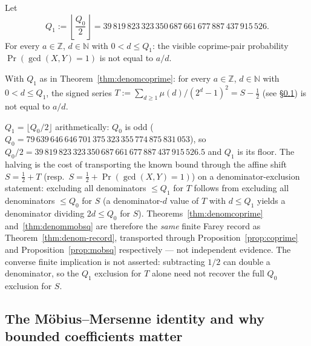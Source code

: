 \begin{thm}
\label{thm:denomcoprime}
Let
\[
Q_1 := \left\lfloor \frac{Q_0}{2} \right\rfloor = 39\,819\,823\,323\,350\,687\,661\,677\,887\,437\,915\,526.
\]
For every $a\in\mathbb{Z}$, $d\in\mathbb{N}$ with $0<d\le Q_1$: the visible
coprime-pair probability $\Pr(\gcd(X,Y)=1)$ is not equal to $a/d$.
  
\end{thm}

\begin{thm}
\label{thm:denommobsq}
With $Q_1$ as in Theorem~\ref{thm:denomcoprime}: for every $a\in\mathbb{Z}$,
$d\in\mathbb{N}$ with $0<d\le Q_1$, the signed series
$T := \sum_{d\ge1} \mu(d)/(2^d-1)^2 = S - \tfrac12$ (see \S\ref{ssec:mobius})
is not equal to $a/d$.
  
\end{thm}

\begin{rem}
$Q_1 = \lfloor Q_0/2 \rfloor$ arithmetically: $Q_0$ is odd
($Q_0 = 79\,639\,646\,646\,701\,375\,323\,355\,774\,875\,831\,053$), so
$Q_0/2 = 39\,819\,823\,323\,350\,687\,661\,677\,887\,437\,915\,526.5$ and
$Q_1$ is its floor. The halving is the cost of transporting the known bound
through the affine shift
$S = \tfrac12 + T$ (resp.\ $S = \tfrac12 + \Pr(\gcd(X,Y)=1)$) on a
denominator-exclusion statement: excluding all denominators $\le Q_1$ for $T$
follows from excluding all denominators $\le Q_0$ for $S$ (a denominator-$d$
value of $T$ with $d\le Q_1$ yields a
denominator dividing $2d\le Q_0$ for $S$). Theorems~\ref{thm:denomcoprime}
and~\ref{thm:denommobsq} are therefore the \emph{same} finite Farey record as
Theorem~\ref{thm:denom-record}, transported through Proposition~\ref{prop:coprime}
and Proposition~\ref{prop:mobsq} respectively --- not independent evidence.
The converse finite implication is not asserted: subtracting $1/2$ can double
a denominator, so the $Q_1$ exclusion for $T$ alone need not recover the full
$Q_0$ exclusion for $S$.
\end{rem}

\subsection{The M\"obius--Mersenne identity and why bounded coefficients matter}
\label{ssec:mobius}

